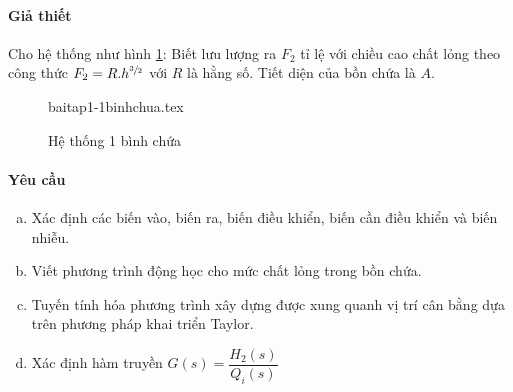 \paragraph{Giả thiết}
    Cho hệ thống như hình \ref{baitap1-1binhchua}: Biết lưu lượng ra $F_2$ tỉ lệ với chiều cao chất lỏng theo công thức $F_2 = R.h^{\sfrac{3}{2}}$ với $R$ là hằng số. Tiết diện của bồn chứa là $A$.
    \begin{figure}[htp]
        \begin{center}
            {baitap1-1binhchua.tex}
        \end{center}
        \caption{Hệ thống 1 bình chứa} \label{baitap1-1binhchua}
    \end{figure}

\paragraph{Yêu cầu}
    \begin{enumerate}[a.]
        \item Xác định các biến vào, biến ra, biến điều khiển, biến cần điều khiển và biến nhiễu.
        \item Viết phương trình động học cho mức chất lỏng trong bồn chứa.
        \item Tuyến tính hóa phương trình xây dựng được xung quanh vị trí cân bằng dựa trên phương pháp khai triển Taylor.
        \item Xác định hàm truyền $G(s) = \dfrac{H_2(s)}{Q_i(s)}$
    \end{enumerate}

